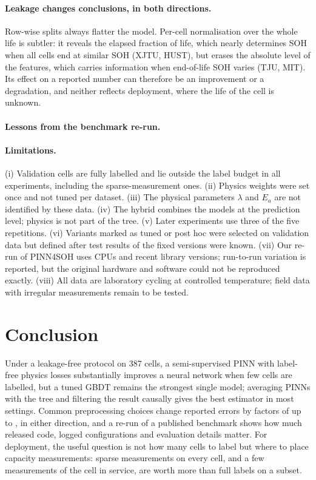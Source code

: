 \documentclass[11pt,a4paper]{article}
\begin{document}
\paragraph{Leakage changes conclusions, in both directions.} Row-wise splits always flatter the model. Per-cell
normalisation over the whole life is subtler: it reveals the elapsed fraction of life, which nearly determines SOH when
all cells end at similar SOH (XJTU, HUST), but erases the absolute level of the features, which carries information when
end-of-life SOH varies (TJU, MIT). Its effect on a reported number can therefore be an improvement or a degradation, and
neither reflects deployment, where the life of the cell is unknown.

\paragraph{Lessons from the benchmark re-run.} \BenchDiscussion

\paragraph{Limitations.} (i) Validation cells are fully labelled and lie outside the label budget in all experiments,
including the sparse-measurement ones. (ii) Physics weights were set once and not tuned per dataset. (iii) The physical
parameters $\lambda$ and $E_a$ are not identified by these data. (iv) The hybrid combines the models at the prediction
level; physics is not part of the tree. (v) Later experiments use three of the five repetitions. (vi) Variants marked
as tuned or post hoc were selected on validation data but defined after test results of the fixed versions were known.
(vii) Our re-run of PINN4SOH uses CPUs and recent library versions; run-to-run variation is reported, but the original
hardware and software could not be reproduced exactly. (viii) All data are laboratory cycling at controlled
temperature; field data with irregular measurements remain to be tested.

\section{Conclusion}
Under a leakage-free protocol on 387 cells, a semi-supervised PINN with label-free physics losses substantially improves
a neural network when few cells are labelled, but a tuned GBDT remains the strongest single model; averaging PINNs with
the tree and filtering the result causally gives the best estimator in most settings. Common preprocessing choices
change reported errors by factors of up to \LeakMaxFactor, in either direction, and a re-run of a published benchmark shows how
much released code, logged configurations and evaluation details matter. For deployment, the useful question is not how
many cells to label but where to place capacity measurements: sparse measurements on every cell, and a few
measurements of the cell in service, are worth more than full labels on a subset.
\end{document}
